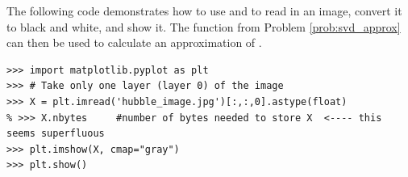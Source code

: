 The following code demonstrates how to use  and  to read in an image, convert it to black and white, and show it.
The function from Problem \ref{prob:svd_approx} can then be used to calculate an approximation of .
\begin{lstlisting}
>>> import matplotlib.pyplot as plt
>>> # Take only one layer (layer 0) of the image
>>> X = plt.imread('hubble_image.jpg')[:,:,0].astype(float)
% >>> X.nbytes     #number of bytes needed to store X  <---- this seems superfluous
>>> plt.imshow(X, cmap="gray")
>>> plt.show()
\end{lstlisting}

